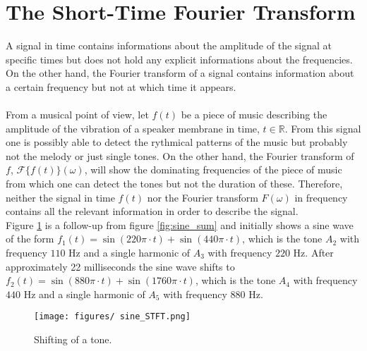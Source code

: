 \section{The Short-Time Fourier Transform}
A signal in time contains informations about the amplitude of the signal at specific times but does not hold any explicit informations about the frequencies. On the other hand, the Fourier transform of a signal contains information about a certain frequency but not at which time it appears.
\\ \\
From a musical point of view, let $f(t)$ be a piece of music describing the amplitude of the vibration of a speaker membrane in time, $t \in \mathbb{R}$. From this signal one is possibly able to detect the rythmical patterns of the music but probably not the melody or just single tones. On the other hand, the Fourier transform of $f$, $\mathcal{F}\{f(t)\}(\omega)$, will show the dominating frequencies of the piece of music from which one can detect the tones but not the duration of these. Therefore, neither the signal in time $f(t)$ nor the Fourier transform $F(\omega)$ in frequency contains all the relevant information in order to describe the signal.
\\
Figure \ref{fig:sine_STFT} is a follow-up from figure \ref{fig:sine_sum} and initially shows a sine wave of the form $f_1(t) = \sin(220\pi\cdot t) + \sin(440\pi\cdot t)$, which is the tone $A_2$ with frequency $110$ Hz and a single harmonic of $A_3$ with frequency $220$ Hz. After approximately 22 milliseconds the sine wave shifts to $f_2(t) = \sin(880\pi\cdot t) + \sin(1760\pi\cdot t)$, which is the tone $A_4$ with frequency $440$ Hz and a single harmonic of $A_5$ with frequency $880$ Hz.

\begin{figure}[H]
    \centering
    \texttt{[image: figures/ sine\_STFT.png]}
    \caption{Shifting of a tone.}
    \label{fig:sine_STFT}
\end{figure}

